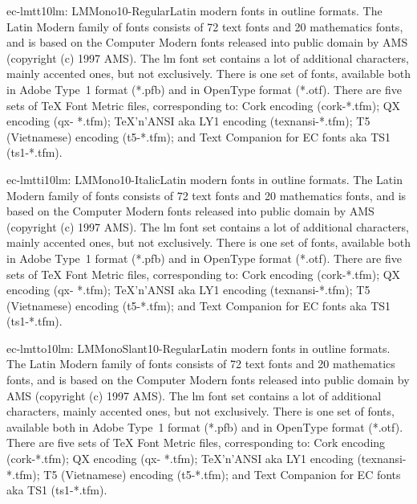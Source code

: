 \documentclass{ddltxtyp}
\begin{document}
\begin{package}{ec-lmtt10}{lm: LMMono10-Regular}{Latin modern fonts in outline formats.}
The Latin Modern family of fonts consists of 72 text fonts and
20 mathematics fonts, and is based on the Computer Modern fonts
released into public domain by AMS (copyright (c) 1997 AMS).
The lm font set contains a lot of additional characters, mainly
accented ones, but not exclusively. There is one set of fonts,
available both in Adobe Type~1 format (*.pfb) and in OpenType
format (*.otf). There are five sets of {\TeX} Font Metric files,
corresponding to: Cork encoding (cork-*.tfm); QX encoding (qx-
*.tfm); {\TeX}'n'ANSI aka LY1 encoding (texnansi-*.tfm); T5
(Vietnamese) encoding (t5-*.tfm); and Text Companion for EC
fonts aka TS1 (ts1-*.tfm).
\end{package}
\begin{package}{ec-lmtti10}{lm: LMMono10-Italic}{Latin modern fonts in outline formats.}
The Latin Modern family of fonts consists of 72 text fonts and
20 mathematics fonts, and is based on the Computer Modern fonts
released into public domain by AMS (copyright (c) 1997 AMS).
The lm font set contains a lot of additional characters, mainly
accented ones, but not exclusively. There is one set of fonts,
available both in Adobe Type~1 format (*.pfb) and in OpenType
format (*.otf). There are five sets of {\TeX} Font Metric files,
corresponding to: Cork encoding (cork-*.tfm); QX encoding (qx-
*.tfm); {\TeX}'n'ANSI aka LY1 encoding (texnansi-*.tfm); T5
(Vietnamese) encoding (t5-*.tfm); and Text Companion for EC
fonts aka TS1 (ts1-*.tfm).
\end{package}
\begin{package}{ec-lmtto10}{lm: LMMonoSlant10-Regular}{Latin modern fonts in outline formats.}
The Latin Modern family of fonts consists of 72 text fonts and
20 mathematics fonts, and is based on the Computer Modern fonts
released into public domain by AMS (copyright (c) 1997 AMS).
The lm font set contains a lot of additional characters, mainly
accented ones, but not exclusively. There is one set of fonts,
available both in Adobe Type~1 format (*.pfb) and in OpenType
format (*.otf). There are five sets of {\TeX} Font Metric files,
corresponding to: Cork encoding (cork-*.tfm); QX encoding (qx-
*.tfm); {\TeX}'n'ANSI aka LY1 encoding (texnansi-*.tfm); T5
(Vietnamese) encoding (t5-*.tfm); and Text Companion for EC
fonts aka TS1 (ts1-*.tfm).
\end{package}
\end{document}
